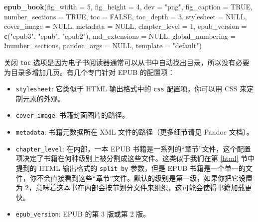 \documentclass[
  12pt,
]{krantz}
\newenvironment{Shaded}{\begin{snugshade}}{\end{snugshade}}
\newcommand{\AttributeTok}[1]{\textcolor[rgb]{0.13,0.29,0.53}{#1}}
\newcommand{\ConstantTok}[1]{\textcolor[rgb]{0.56,0.35,0.01}{#1}}
\newcommand{\DecValTok}[1]{\textcolor[rgb]{0.00,0.00,0.81}{#1}}
\newcommand{\FunctionTok}[1]{\textcolor[rgb]{0.13,0.29,0.53}{\textbf{#1}}}
\newcommand{\NormalTok}[1]{#1}
\newcommand{\SpecialCharTok}[1]{\textcolor[rgb]{0.81,0.36,0.00}{\textbf{#1}}}
\newcommand{\StringTok}[1]{\textcolor[rgb]{0.31,0.60,0.02}{#1}}
\providecommand{\tightlist}{%
  \setlength{\itemsep}{0pt}\setlength{\parskip}{0pt}}
\theoremstyle{definition}
\theoremstyle{definition}
\theoremstyle{definition}
\theoremstyle{definition}
\theoremstyle{remark}
\begin{document}
\begin{Shaded}
\begin{Highlighting}[]
\FunctionTok{epub\_book}\NormalTok{(}\AttributeTok{fig\_width =} \DecValTok{5}\NormalTok{, }\AttributeTok{fig\_height =} \DecValTok{4}\NormalTok{, }\AttributeTok{dev =} \StringTok{"png"}\NormalTok{,}
  \AttributeTok{fig\_caption =} \ConstantTok{TRUE}\NormalTok{, }\AttributeTok{number\_sections =} \ConstantTok{TRUE}\NormalTok{,}
  \AttributeTok{toc =} \ConstantTok{FALSE}\NormalTok{, }\AttributeTok{toc\_depth =} \DecValTok{3}\NormalTok{, }\AttributeTok{stylesheet =} \ConstantTok{NULL}\NormalTok{,}
  \AttributeTok{cover\_image =} \ConstantTok{NULL}\NormalTok{, }\AttributeTok{metadata =} \ConstantTok{NULL}\NormalTok{,}
  \AttributeTok{chapter\_level =} \DecValTok{1}\NormalTok{,}
  \AttributeTok{epub\_version =} \FunctionTok{c}\NormalTok{(}\StringTok{"epub3"}\NormalTok{, }\StringTok{"epub"}\NormalTok{, }\StringTok{"epub2"}\NormalTok{),}
  \AttributeTok{md\_extensions =} \ConstantTok{NULL}\NormalTok{,}
  \AttributeTok{global\_numbering =} \SpecialCharTok{!}\NormalTok{number\_sections,}
  \AttributeTok{pandoc\_args =} \ConstantTok{NULL}\NormalTok{, }\AttributeTok{template =} \StringTok{"default"}\NormalTok{)}
\end{Highlighting}
\end{Shaded}

关闭 \texttt{toc} 选项是因为电子书阅读器通常可以从书中自动找出目录，所以没有必要为目录多增加几页。有几个专门针对 EPUB 的配置项：

\begin{itemize}
\tightlist
\item
  \texttt{stylesheet}: 它类似于 HTML 输出格式中的 \texttt{css} 配置项，你可以用 CSS 来定制元素的外观。
\item
  \texttt{cover\_image}: 书籍封面图片的路径。
\item
  \texttt{metadata}: 书籍元数据所在 XML 文件的路径（更多细节请见 Pandoc 文档）。
\item
  \texttt{chapter\_level}: 在内部，一本 EPUB 书籍是一系列的``章节''文件，这个配置项决定了书籍在何种级别上被分割成这些文件。这类似于我们在第 \ref{html} 节中提到的 HTML 输出格式的 \texttt{split\_by} 参数，但是 EPUB 书籍是一个单一的文件，你不会直接看到这些``章节''文件。默认的级别是第一级，如果你把它设置为 2，意味着这本书在内部会按节划分文件来组织，这可能会使得书籍加载更快。
\item
  \texttt{epub\_version}: EPUB 的第 3 版或第 2 版。
\end{itemize}
\end{document}
